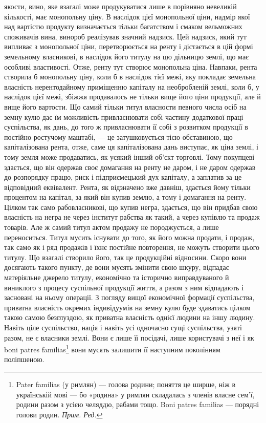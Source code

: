 \parcont{}  %
якости, вино, яке взагалі може продукуватися лише в порівняно невеликій кількості,
має монопольну ціну. В наслідок цієї монопольної ціни, надмір якої над вартістю
продукту визначається тільки багатством і смаком вельможних споживачів вина,
винороб реалізував значний надзиск. Цей надзиск, який тут випливає з монопольної
ціни, перетворюється на ренту і дістається в цій формі земельному власникові, в
наслідок його титулу на цю дільницю землі, що має особливі властивості. Отже,
ренту тут створює монопольна ціна. Навпаки, рента створила б монопольну ціну,
коли б в наслідок тієї межі, яку покладає земельна власність нерентодайному приміщенню
капіталу на необробленій землі, коли б, у наслідок цієї межі, збіжжя продавалось
не тільки вище його ціни продукції, але й вище його вартости. Що самий
тільки титул власности певного числа осіб на земну кулю дає їм можливість привласнювати
собі частину додаткової праці суспільства, як дань, до того ж привласнювати
її собі з розвитком продукції в постійно ростучому маштабі, — це затушковується
тією обставиною, що капіталізована рента, отже, саме ця капіталізована
дань виступає, як ціна землі, і тому земля може продаватись, як усякий інший
об’єкт торговлі. Тому покупцеві здається, що він одержав своє домагання на ренту
не даром, і не даром одержав до розпорядку працю, риск і підприємецький дух
капіталу, а заплатив за це відповідний еквівалент. Рента, як відзначено вже
давніш, здається йому тільки процентом на капітал, за який він купив землю,
а тому і домагання на ренту. Цілком так само рабовласникові, що купив негра,
здається, що він придбав свою власність на негра не через інститут рабства
як такий, а через купівлю та продаж товарів. Але ж самий титул актом продажу
не породжується, а лише переноситься. Титул мусить існувати до того,
як його можна продати, і продаж, так само як і ряд продажів і їхнє постійне
повторення, не можуть створити цього титулу. Що взагалі створило його, так
це продукційні відносини. Скоро вони досягають такого пункту, де вони мусять
змінити свою шкуру, відпадає матеріяльне джерело титулу, економічно
та історично виправдуваного й виниклого з процесу суспільної продукції
життя, а разом з ним відпадають і засновані на ньому операції. З погляду
вищої економічної формації суспільства, приватна власність окремих індивідуумів
на земну кулю буде здаватись цілком такою самою безглуздою, як приватна
власність однієї людини на іншу людину. Навіть ціле суспільство, нація
і навіть усі одночасно сущі суспільства, узяті разом, не є власники землі. Вони є
лише її посідачі, лише користувачі з неї і як boni patres familias\footnote*{
Pater familias (у римлян) — голова родини; поняття це ширше, ніж в українській мові — бо
«родина» у римлян складалась з членів власне сем’ї, родини разом з усією челяддю, рабами тощо. Boni
patres familias — порядні голови родин. \emph{Прим. Ред.}
} вони мусять залишити її наступним поколінням поліпшеною.

